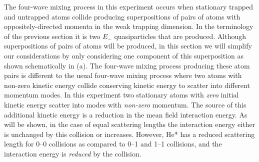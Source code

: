 The four-wave mixing process in this experiment occurs when stationary trapped and untrapped atoms collide producing superpositions of pairs of atoms with oppositely-directed momenta in the weak trapping dimension. In the terminology of the previous section it is two $E_-$ quasiparticles that are produced. Although superpositions of pairs of atoms will be produced, in this section we will simplify our considerations by only considering one component of this superposition as shown schematically in (a). The four-wave mixing process producing these atom pairs is different to the usual four-wave mixing process where two atoms with non-zero kinetic energy collide conserving kinetic energy to scatter into different momentum modes. In this experiment two stationary atoms with \emph{zero} initial kinetic energy scatter into modes with \emph{non-zero} momentum. The source of this additional kinetic energy is  a reduction in the mean field interaction energy. As will be shown, in the case of equal scattering lengths the interaction energy either is unchanged by this collision or increases. However, He* has a reduced scattering length for 0--0 collisions as compared to 0--1 and 1--1 collisions, and the interaction energy is \emph{reduced} by the collision.

